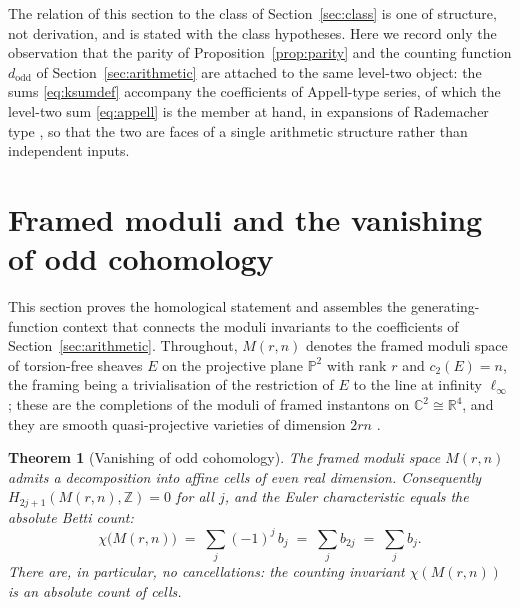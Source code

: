 \documentclass[11pt,a4paper]{article}
\newcommand{\R}{\mathbb{R}}
\newcommand{\Z}{\mathbb{Z}}
\newcommand{\C}{\mathbb{C}}
\newcommand{\PP}{\mathbb{P}}
\newcommand{\dodd}{d_{\mathrm{odd}}}
\newcommand{\Mod}{M}
\theoremstyle{plain}
\newtheorem{theorem}{Theorem}[section]
\theoremstyle{definition}
\theoremstyle{remark}
\begin{document}
The relation of this section to the class of Section~\ref{sec:class} is one of structure, not derivation, and is stated with the class hypotheses. Here we record only the observation that the parity of Proposition~\ref{prop:parity} and the counting function $\dodd$ of Section~\ref{sec:arithmetic} are attached to the same level-two object: the sums \eqref{eq:ksumdef} accompany the coefficients of Appell-type series, of which the level-two sum \eqref{eq:appell} is the member at hand, in expansions of Rademacher type \cite{BringmannOno}, so that the two are faces of a single arithmetic structure rather than independent inputs.

\section{Framed moduli and the vanishing of odd cohomology}\label{sec:moduli}

This section proves the homological statement and assembles the generating-function context that connects the moduli invariants to the coefficients of Section~\ref{sec:arithmetic}. Throughout, $\Mod(r,n)$ denotes the framed moduli space of torsion-free sheaves $E$ on the projective plane $\PP^2$ with rank $r$ and $c_2(E) = n$, the framing being a trivialisation of the restriction of $E$ to the line at infinity $\ell_\infty$; these are the completions of the moduli of framed instantons on $\C^2 \cong \R^4$, and they are smooth quasi-projective varieties of dimension $2rn$ \cite{NakajimaYoshioka}.

\begin{theorem}[Vanishing of odd cohomology]\label{thm:betti}
The framed moduli space $\Mod(r,n)$ admits a decomposition into affine cells of even real dimension. Consequently $H_{2j+1}(\Mod(r,n), \Z) = 0$ for all $j$, and the Euler characteristic equals the absolute Betti count:
\begin{equation}\label{eq:chiabs}
  \chi\bigl(\Mod(r,n)\bigr) \;=\; \sum_j (-1)^j\, b_j \;=\; \sum_j b_{2j}
  \;=\; \sum_j b_j .
\end{equation}
There are, in particular, no cancellations: the counting invariant $\chi(\Mod(r,n))$ is an absolute count of cells.
\end{theorem}
\end{document}

